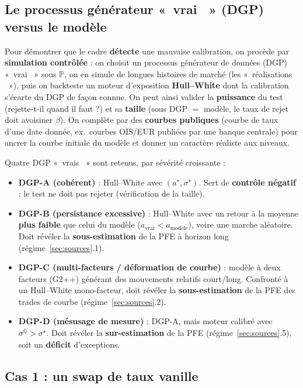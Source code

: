 \documentclass[11pt,a4paper]{article}
\providecommand{\og}{«~}
\providecommand{\fg}{~»}
\newcommand{\Prob}{\mathbb{P}}
\newcommand{\Qmeas}{\mathbb{Q}}
\theoremstyle{remark}
\begin{document}
\subsection{Le processus générateur \og vrai \fg{} (DGP) versus le modèle}

Pour démontrer que le cadre \textbf{détecte} une mauvaise calibration, on procède par \textbf{simulation contrôlée} : on choisit un processus générateur de données (DGP) \og vrai \fg{} sous $\Prob$, on en simule de longues histoires de marché (les \og réalisations \fg{}), puis on backteste un moteur d'exposition \textbf{Hull--White} dont la calibration s'écarte du DGP de façon connue. On peut ainsi valider la \textbf{puissance} du test (rejette-t-il quand il faut ?) et sa \textbf{taille} (sous DGP $=$ modèle, le taux de rejet doit avoisiner $\beta$). On complète par des \textbf{courbes publiques} (courbe de taux d'une date donnée, ex.\ courbes OIS/EUR publiées par une banque centrale) pour ancrer la courbe initiale du modèle et donner un caractère réaliste aux niveaux.

Quatre DGP \og vrais \fg{} sont retenus, par sévérité croissante :
\begin{itemize}[nosep]
  \item \textbf{DGP-A (cohérent)} : Hull--White avec $(a^\star, \sigma^\star)$. Sert de \textbf{contrôle négatif} : le test ne doit pas rejeter (vérification de la taille).
  \item \textbf{DGP-B (persistance excessive)} : Hull--White avec un retour à la moyenne \textbf{plus faible} que celui du modèle ($a_{\text{vrai}} < a_{\text{modèle}}$), voire une marche aléatoire. Doit révéler la \textbf{sous-estimation} de la PFE à horizon long (régime~\ref{sec:sources}.1).
  \item \textbf{DGP-C (multi-facteurs / déformation de courbe)} : modèle à deux facteurs (G2++) générant des mouvements relatifs court/long. Confronté à un Hull--White mono-facteur, doit révéler la \textbf{sous-estimation} de la PFE des trades de courbe (régime~\ref{sec:sources}.2).
  \item \textbf{DGP-D (mésusage de mesure)} : DGP-A, mais moteur calibré avec $\sigma^{\Qmeas} > \sigma^\star$. Doit révéler la \textbf{sur-estimation} de la PFE (régime~\ref{sec:sources}.5), soit un \textbf{déficit} d'exceptions.
\end{itemize}

\subsection{Cas 1 : un swap de taux vanille}
\end{document}
